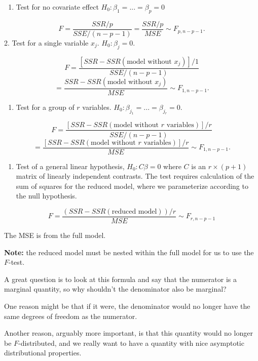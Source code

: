 \documentclass[
  letterpaper,
  DIV=11,
  numbers=noendperiod]{scrreport}
\providecommand{\tightlist}{%
  \setlength{\itemsep}{0pt}\setlength{\parskip}{0pt}}\usepackage{longtable,booktabs,array}
\begin{document}
\begin{enumerate}
\def\labelenumi{\arabic{enumi}.}
\tightlist
\item
  Test for no covariate effect \(H_0: \beta_1 = ... = \beta_p = 0\)
\end{enumerate}

\[F = \frac{SSR/p}{SSE/(n-p-1)} = \frac{SSR/p}{MSE} \sim F_{p,n-p-1}.\]
2. Test for a single variable \(x_j\). \(H_0 : \beta_j = 0\).

\[F = \frac{[SSR - SSR(\text{model without } x_j)]/1}{SSE/(n-p-1)}\]
\[ = 
  \frac{SSR - SSR(\text{model without } x_j)}{MSE} \sim F_{1, n-p-1}.\]

\begin{enumerate}
\def\labelenumi{\arabic{enumi}.}
\setcounter{enumi}{2}
\tightlist
\item
  Test for a group of \(r\) variables.
  \(H_0: \beta_{j_1} = ... = \beta_{j_r} = 0\).
\end{enumerate}

\[F = \frac{[SSR - SSR(\text{model without } r \text{ variables})]/r}{SSE/(n-p-1)}\]
\[ = \frac{[SSR - SSR(\text{model without } r \text{ variables})]/r}{MSE} \sim F_{1,n-p-1}.\]

\begin{enumerate}
\def\labelenumi{\arabic{enumi}.}
\setcounter{enumi}{3}
\tightlist
\item
  Test of a general linear hypothesis, \(H_0: C\beta= 0\) where \(C\) is
  an \(r \times (p+1)\) matrix of linearly independent contrasts. The
  test requires calculation of the sum of squares for the reduced model,
  where we parameterize according to the null hypothesis.
\end{enumerate}

\[F = \frac{(SSR - SSR(\text{reduced model}))/r}{MSE} \sim F_{r,n-p-1}\]

The MSE is from the full model.

\textbf{Note:} the reduced model must be nested within the full model
for us to use the \(F\)-test.

A great question is to look at this formula and say that the numerator
is a marginal quantity, so why shouldn't the denominator also be
marginal?

One reason might be that if it were, the denominator would no longer
have the same degrees of freedom as the numerator.

Another reason, arguably more important, is that this quantity would no
longer be \(F\)-distributed, and we really want to have a quantity with
nice asymptotic distributional properties.
\end{document}

